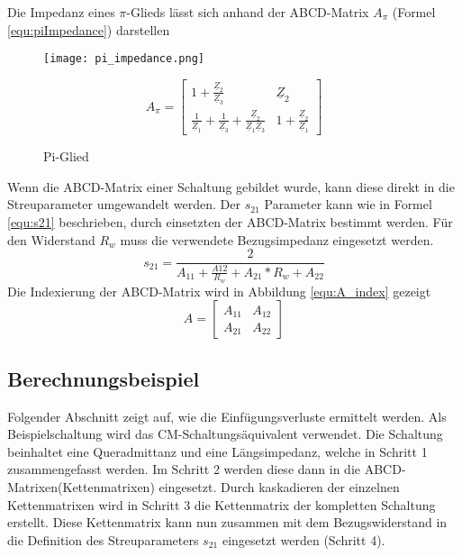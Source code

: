 Die Impedanz eines  $\pi$-Glieds lässt sich anhand der ABCD-Matrix $A_\pi$ (Formel \ref{equ:piImpedance}) darstellen
\begin{figure}[H]
	\begin{minipage}[h]{0.45\linewidth}
		\centering
		\texttt{[image: pi\_impedance.png]}
		\label{fig:piImpedance}
		\caption{Pi-Glied}
	\end{minipage}
	\begin{minipage}[h]{0.45\linewidth}
		\begin{equation}\label{equ:piImpedance}
			A_\pi = \left[\begin{matrix}
			1+\frac{\underline{Z}_2}{\underline{Z}_3}&\underline{Z}_2\\
			\frac{1}{\underline{Z}_1}+\frac{1}{\underline{Z}_3}+\frac{\underline{Z}_2}{\underline{Z}_1\underline{Z}_3}&1+\frac{\underline{Z}_2}				{\underline{Z}_1}
			\end{matrix}\right]
		\end{equation}
	\end{minipage}
\end{figure}

Wenn die ABCD-Matrix einer Schaltung gebildet wurde, kann diese direkt in die Streuparameter umgewandelt werden. Der $s_{21}$ Parameter kann wie in Formel \ref{equ:s21} beschrieben, durch einsetzten der ABCD-Matrix bestimmt werden. Für den Widerstand $R_w$ muss die verwendete Bezugsimpedanz eingesetzt werden.
\begin{equation}\label{equ:s21}
s_{21} = \frac{2}{A_{11}+\frac{A{12}}{R_w}+A_{21}*R_w+A_{22}}
\end{equation}
Die Indexierung der ABCD-Matrix wird in Abbildung \ref{equ:A_index} gezeigt
\begin{equation}\label{equ:A_index}
	A = \left[\begin{matrix}
	A_{11}&A_{12}\\A_{21}&A_{22}
	\end{matrix}\right]
\end{equation}
\newpage

\subsection{Berechnungsbeispiel} \label{subsec:beispiel}
Folgender Abschnitt zeigt auf, wie die Einfügungsverluste ermittelt werden. Als Beispielschaltung wird das CM-Schaltungsäquivalent verwendet. Die Schaltung beinhaltet eine Queradmittanz und eine Längsimpedanz, welche in Schritt 1 zusammengefasst werden. Im Schritt 2 werden diese dann in die ABCD-Matrixen(Kettenmatrixen) eingesetzt. Durch kaskadieren der einzelnen Kettenmatrixen wird in Schritt 3 die Kettenmatrix der kompletten Schaltung erstellt. Diese Kettenmatrix kann nun zusammen mit dem Bezugswiderstand in die Definition des Streuparameters $s_{21}$ eingesetzt werden (Schritt 4).

